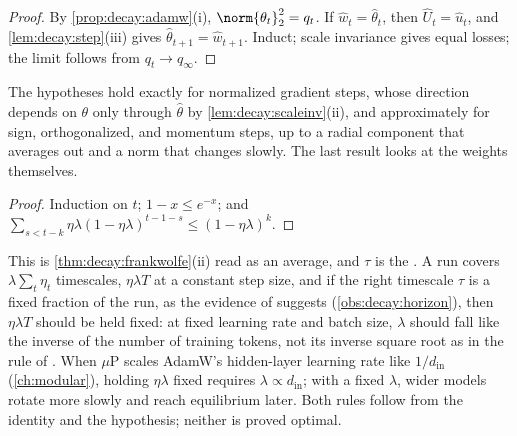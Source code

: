 \begin{refsection}
\begin{proof}
By \cref{prop:decay:adamw}(i), $\norm{\theta_t}_2^2=q_t$. If $\hat w_t=\hat\theta_t$, then $\hat U_t=\hat u_t$, and \cref{lem:decay:step}(iii) gives $\hat\theta_{t+1}=\hat w_{t+1}$. Induct; scale invariance gives equal losses; the limit follows from $q_t\to q_\infty$.
\end{proof}

The hypotheses hold exactly for normalized gradient steps, whose direction depends on $\theta$ only through $\hat\theta$ by \cref{lem:decay:scaleinv}(ii), and approximately for sign, orthogonalized, and momentum steps, up to a radial component that averages out and a norm that changes slowly. The last result looks at the weights themselves.


\begin{proof}
Induction on $t$; $1-x\le e^{-x}$; and $\sum_{s<t-k}\eta\lambda(1-\eta\lambda)^{t-1-s}\le(1-\eta\lambda)^k$.
\end{proof}

This is \cref{thm:decay:frankwolfe}(ii) read as an average, and $\tau$ is the . A run covers $\lambda\sum_t\eta_t$ timescales, $\eta\lambda T$ at a constant step size, and if the right timescale $\tau$ is a fixed fraction of the run, as the evidence of \textcite{WangAitchison2025} suggests (\cref{obs:decay:horizon}), then $\eta\lambda T$ should be held fixed: at fixed learning rate and batch size, $\lambda$ should fall like the inverse of the number of training tokens, not its inverse square root as in the rule of \textcite{LoshchilovHutter2019}. When $\mu$P scales AdamW's hidden-layer learning rate like $1/d_{\mathrm{in}}$ (\cref{ch:modular}), holding $\eta\lambda$ fixed requires $\lambda\propto d_{\mathrm{in}}$; with a fixed $\lambda$, wider models rotate more slowly and reach equilibrium later. Both rules follow from the identity and the hypothesis; neither is proved optimal.


\end{refsection}
